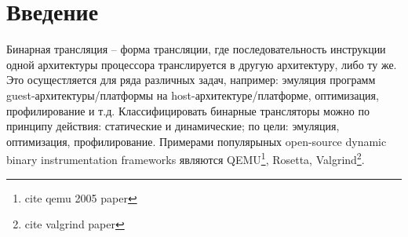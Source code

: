 
\section*{Введение}
\thispagestyle{withCompileDate}

Бинарная трансляция -- форма трансляции, где последовательность инструкции одной архитектуры процессора транслируется в другую архитектуру, либо ту же. Это осущестляется для ряда различных задач, например: эмуляция программ guest-архитектуры/платформы на host-архитектуре/платформе, оптимизация, профилирование и т.д. Классифицировать бинарные трансляторы можно по принципу действия: статические и динамические; по цели: эмуляция, оптимизация, профилирование. Примерами популярыных open-source dynamic binary instrumentation frameworks являются QEMU\footnote{cite qemu 2005 paper}, Rosetta, Valgrind\footnote{cite valgrind paper}.








